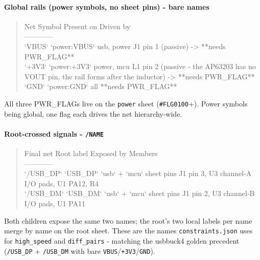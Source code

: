 \documentclass[11pt,a4paper]{article}
\begin{document}
\paragraph*{Global rails (power symbols, no sheet pins) - bare names}
\begin{quote}\small\ttfamily\raggedright
\textbar{} Net \textbar{} Symbol \textbar{} Present on \textbar{} Driven by \textbar{}\\
\textbar{}---\textbar{}---\textbar{}---\textbar{}---\textbar{}\\
\textbar{} `VBUS` \textbar{} `power:VBUS` \textbar{} usb, power \textbar{} J1 pin 1 (passive) -\textgreater{} {*}{*}needs PWR\_FLAG{*}{*} \textbar{}\\
\textbar{} `+3V3` \textbar{} `power:+3V3` \textbar{} power, mcu \textbar{} L1 pin 2 (passive - the AP63203 has no VOUT pin, the rail forms after the inductor) -\textgreater{} {*}{*}needs PWR\_FLAG{*}{*} \textbar{}\\
\textbar{} `GND` \textbar{} `power:GND` \textbar{} all \textbar{} {*}{*}needs PWR\_FLAG{*}{*} \textbar{}
\end{quote}
All three PWR\_FLAGs live on the \texttt{power} sheet (\texttt{\#FLG0100}+). Power symbols being global, one flag each drives the net hierarchy-wide.

\paragraph*{Root-crossed signals - \texttt{/NAME}}
\begin{quote}\small\ttfamily\raggedright
\textbar{} Final net \textbar{} Root label \textbar{} Exposed by \textbar{} Members \textbar{}\\
\textbar{}---\textbar{}---\textbar{}---\textbar{}---\textbar{}\\
\textbar{} `/USB\_DP` \textbar{} `USB\_DP` \textbar{} `usb` + `mcu` sheet pins \textbar{} J1 pin 3, U3 channel-A I/O pads, U1 PA12, R4 \textbar{}\\
\textbar{} `/USB\_DM` \textbar{} `USB\_DM` \textbar{} `usb` + `mcu` sheet pins \textbar{} J1 pin 2, U3 channel-B I/O pads, U1 PA11 \textbar{}
\end{quote}
Both children expose the same two names; the root's two local labels per name merge by name on the root sheet. These are the names \texttt{constraints.json} uses for \texttt{high\_speed} and \texttt{diff\_pairs} - matching the usbbuck4 golden precedent (\texttt{/USB\_DP} + \texttt{/USB\_DM} with bare \texttt{VBUS}/\texttt{+3V3}/\texttt{GND}).
\end{document}
